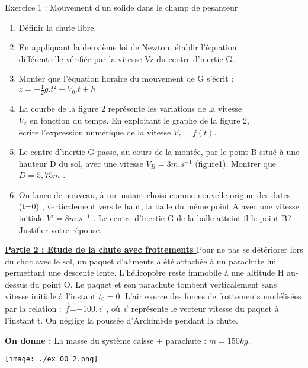 \documentclass[12pt, french]{article}
\begin{document}
\begin{Box2}{Exercice 1 : Mouvement d’un solide dans le champ de pesanteur }
\begin{enumerate}
	\item Définir la chute libre.
	\item En appliquant la deuxième loi de Newton, établir l’équation
\\différentielle vérifiée par la vitesse Vz du centre d’inertie G.
\item Monter que l’équation horaire du mouvement de G s’écrit :\\$z = -\frac{1}{2}g.t^2 +V_0.t + h $
\item La courbe de la figure 2 représente les variations de
la vitesse \\$V_z$ en fonction du temps.
En exploitant le graphe de la figure 2, \\écrire
l’expression numérique de la vitesse $V_z = f(t)$.
\item Le centre d’inertie G passe, au cours de la montée,
	par le point B situé à une \\hauteur D du sol, avec une vitesse $V_B = 3m.s^{-1}$ (figure1). Montrer que   $D =5,75m$ .
\item  On lance de nouveau, à un instant choisi comme
nouvelle origine des dates (t=0) , verticalement vers le
haut, la balle du même point A avec une vitesse
initiale $V' =8m.s^{-1}$ . Le centre d’inertie G de la balle
atteint-il le point B? Justifier votre réponse.

\end{enumerate}

\textbf{\underline{Partie 2 : Etude de la chute avec frottements  }}
Pour ne pas se détériorer lors du choc avec le sol, un paquet d’aliments a été attachée
à un parachute lui permettant une descente lente. L’hélicoptère reste immobile à une
altitude H au-dessus du point O. Le paquet et son parachute tombent verticalement
sans vitesse initiale à l’instant $t_0 = 0$.
L’air exerce des forces de frottements modélisées par la relation : $\vec{f}$=$-100.\vec{v}$ , où $\vec{v}$
représente le vecteur vitesse du paquet à l’instant t.
On néglige la poussée d’Archimède pendant la chute.

\textbf{On donne : } La masse du système {caisse + parachute} : $m = 150 kg$.
  
\begin{center}
	  \vspace{-0.2cm}
	\texttt{[image: ./ex\_00\_2.png]}
  \end{center}
\begin{enumerate}


\end{enumerate}
\end{Box2}
\end{document}
